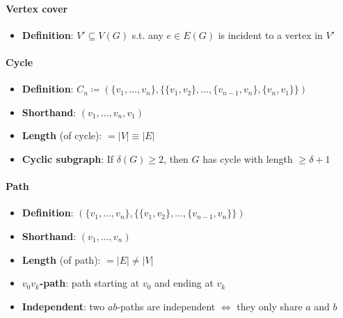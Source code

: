\paragraph{Vertex cover}
\begin{itemize}
  \item \textbf{Definition}: $ V' \subseteq V(G) $ s.t. any $ e \in E(G) $ is incident to a vertex in $ V' $ 
\end{itemize}

\paragraph{Cycle}
\begin{itemize}
  \item \textbf{Definition}: $ C_n \coloneqq (\{ v_1, \dots, v_n \}, \{ \{ v_1, v_2 \},\dots,\{ v_{n-1},v_n \},\{ v_n, v_1 \} \}) $
  \item \textbf{Shorthand}: $ (v_1, \dots, v_n, v_1) $
  \item \textbf{Length} (of cycle): $ = \vert V \vert \equiv \vert E \vert $
  \item \textbf{Cyclic subgraph}: If $ \delta(G) \geq 2 $, then $ G $ has cycle with length $ \geq \delta + 1 $
\end{itemize}

\paragraph{Path}
\begin{itemize}
  \item \textbf{Definition}: $ (\{ v_1, \dots, v_n \}, \{ \{ v_1, v_2 \}, \dots, \{ v_{n-1},v_n \} \}) $
  \item \textbf{Shorthand}: $ (v_1, \dots, v_n) $
  \item \textbf{Length} (of path): $ = \vert E \vert \neq \vert V \vert $
  \item \textbf{$ v_0v_k $-path}: path starting at $ v_0 $ and ending at $ v_k $
  \item \textbf{Independent}: two $ ab $-paths are independent $ \Leftrightarrow $ they only share $ a $ and $ b $
\end{itemize}

